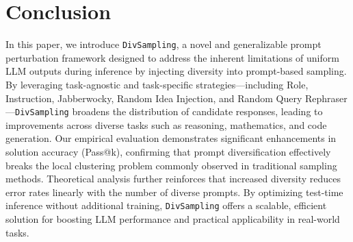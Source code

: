 \section{Conclusion}
In this paper, we introduce \texttt{DivSampling}, a novel and generalizable prompt perturbation framework designed to address the inherent limitations of uniform LLM outputs during inference by injecting diversity into prompt-based sampling. By leveraging task-agnostic and task-specific strategies—including Role, Instruction, Jabberwocky, Random Idea Injection, and Random Query Rephraser—\texttt{DivSampling} broadens the distribution of candidate responses, leading to improvements across diverse tasks such as reasoning, mathematics, and code generation. Our empirical evaluation demonstrates significant enhancements in solution accuracy (Pass@k), confirming that prompt diversification effectively breaks the local clustering problem commonly observed in traditional sampling methods. Theoretical analysis further reinforces that increased diversity reduces error rates linearly with the number of diverse prompts. By optimizing test-time inference without additional training, \texttt{DivSampling} offers a scalable, efficient solution for boosting LLM performance and practical applicability in real-world tasks.